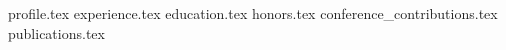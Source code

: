 \documentclass[11pt, a4paper]{awesome-cv}
\newcommand*{\sectiondir}{resume/}
\begin{document}

% 
\makecvheader
% 

{profile.tex}
{experience.tex}
{education.tex}
{honors.tex}
{conference_contributions.tex}
{publications.tex}
\end{document}
